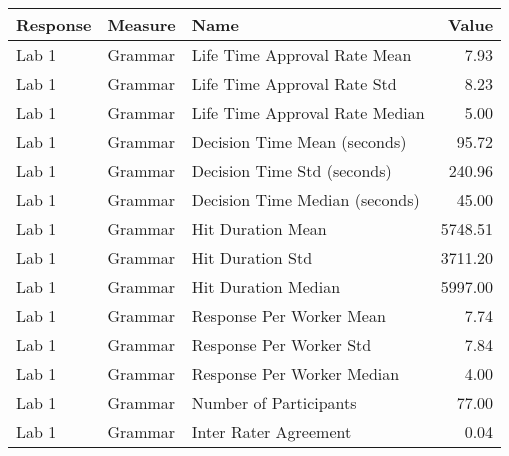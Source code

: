 \begin{tabular}{lllr}
\toprule
Response & Measure & Name & Value \\
\midrule
Lab 1 & Grammar & Life Time Approval Rate Mean & 7.93 \\
Lab 1 & Grammar & Life Time Approval Rate Std & 8.23 \\
Lab 1 & Grammar & Life Time Approval Rate Median & 5.00 \\
Lab 1 & Grammar & Decision Time Mean (seconds) & 95.72 \\
Lab 1 & Grammar & Decision Time Std (seconds) & 240.96 \\
Lab 1 & Grammar & Decision Time Median (seconds) & 45.00 \\
Lab 1 & Grammar & Hit Duration Mean & 5748.51 \\
Lab 1 & Grammar & Hit Duration Std & 3711.20 \\
Lab 1 & Grammar & Hit Duration Median & 5997.00 \\
Lab 1 & Grammar & Response Per Worker Mean & 7.74 \\
Lab 1 & Grammar & Response Per Worker Std & 7.84 \\
Lab 1 & Grammar & Response Per Worker Median & 4.00 \\
Lab 1 & Grammar & Number of Participants & 77.00 \\
Lab 1 & Grammar & Inter Rater Agreement & 0.04 \\
\bottomrule
\end{tabular}
